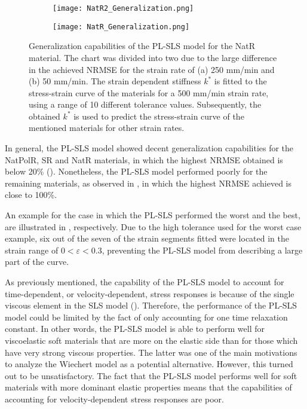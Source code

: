 \begin{figure}[htb!]
	\centering
    \begin{subfigure}[b]{0.49\textwidth}
        \centering
        \texttt{[image: NatR2\_Generalization.png]}
        \caption{}
        \label{fig:GenNatR2}
    \end{subfigure}
    \begin{subfigure}[b]{0.49\textwidth}
        \centering
        \texttt{[image: NatR\_Generalization.png]}
        \caption{}
        \label{fig:GenNatR1}
    \end{subfigure}
    \caption{Generalization capabilities of the PL-SLS model for the NatR material. The chart was divided into two due to the large difference in the achieved NRMSE for the strain rate of (a) 250 mm/min and (b) 50 mm/min. The strain dependent stiffness $k^*$ is fitted to the stress-strain curve of the materials for a 500 mm/min strain rate, using a range of 10 different tolerance values. Subsequently, the obtained $k^*$ is used to predict the stress-strain curve of the mentioned materials for other strain rates.}
    \label{fig:GenOtherAll}
\end{figure}

In general, the PL-SLS model showed decent generalization capabilities for the NatPolR, SR and NatR materials, in which the highest NRMSE obtained is below 20\% (). Nonetheless, the PL-SLS model performed poorly for the remaining materials, as observed in , in which the highest NRMSE achieved is close to 100\%.

\newpage
An example for the case in which the PL-SLS performed the worst and the best, are illustrated in , respectively. Due to the high tolerance used for the worst case example, six out of the seven of the strain segments fitted were located in the strain range of $0 < \varepsilon < 0.3$, preventing the PL-SLS model from describing a large part of the curve.

As previously mentioned, the capability of the PL-SLS model to account for time-dependent, or velocity-dependent, stress responses is because of the single viscous element in the SLS model (). Therefore, the performance of the PL-SLS model could be limited by the fact of only accounting for one time relaxation constant. In other words, the PL-SLS model is able to perform well for viscoelastic soft materials that are more on the elastic side than for those which have very strong viscous properties. The latter was one of the main motivations to analyze the Wiechert model as a potential alternative. However, this turned out to be unsatisfactory. The fact that the PL-SLS model performs well for soft materials with more dominant elastic properties means that the capabilities of accounting for velocity-dependent stress responses are poor.

